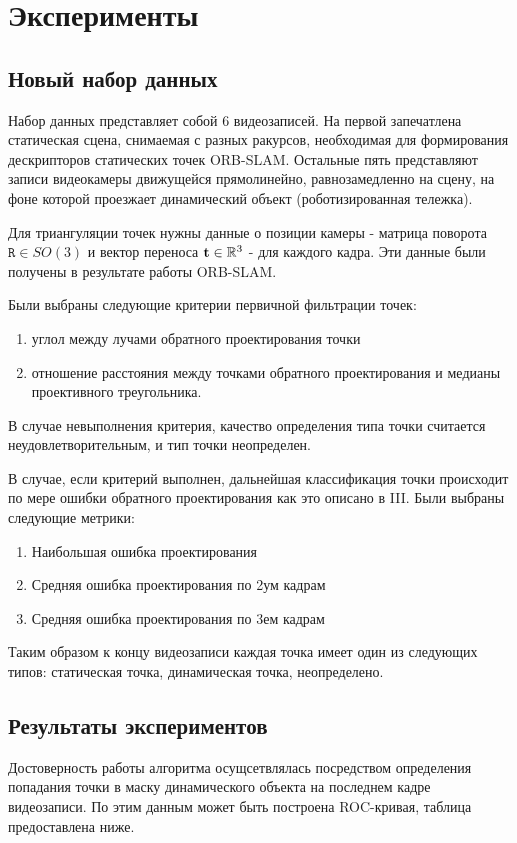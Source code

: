 \documentclass[conference]{IEEEtran}
\begin{document}
\section{Эксперименты}
\subsection{Новый набор данных }
Набор данных представляет собой 6 видеозаписей. На первой запечатлена статическая сцена, снимаемая с разных ракурсов, необходимая для формирования дескрипторов статических точек ORB-SLAM. Остальные пять представляют записи видеокамеры движущейся прямолинейно, равнозамедленно на сцену, на фоне которой проезжает динамический объект (роботизированная тележка).


Для триангуляции точек нужны данные о позиции камеры - матрица поворота $\mathtt{R} \in SO(3)$ и вектор переноса ${\bf t} \in \mathbb{R}^3$ - для каждого кадра. Эти данные были получены в результате работы ORB-SLAM.

Были выбраны следующие критерии первичной фильтрации точек:
\begin{enumerate}
\item углол между лучами обратного проектирования точки
\item отношение расстояния между точками обратного проектирования и медианы проективного треугольника.
\end{enumerate}
В случае невыполнения критерия, качество определения типа точки считается неудовлетворительным, и тип точки неопределен.

В случае, если критерий выполнен, дальнейшая классификация точки происходит по мере ошибки обратного проектирования как это описано в III. Были выбраны следующие метрики:
\begin{enumerate}
\item Наибольшая ошибка проектирования
\item Средняя ошибка проектирования по 2ум кадрам
\item Средняя ошибка проектирования по 3ем кадрам
\end{enumerate}

Таким образом к концу видеозаписи каждая точка имеет один из следующих типов: статическая точка, динамическая точка, неопределено. 

\subsection{Результаты экспериментов}
Достоверность работы алгоритма осущсетвлялась посредством определения попадания точки в маску динамического объекта на последнем кадре видеозаписи.
По этим данным может быть построена ROC-кривая, таблица предоставлена ниже.
\end{document}
